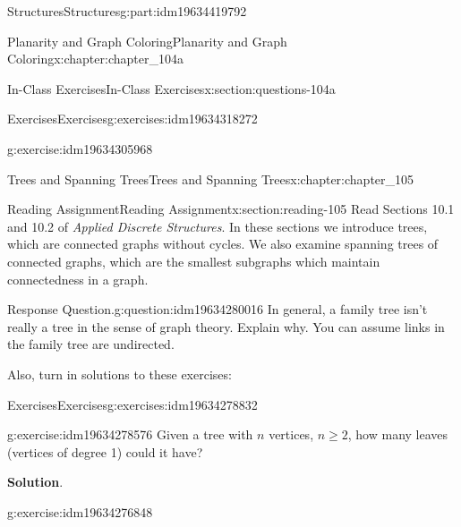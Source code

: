 \documentclass[oneside,10pt,]{book}
\newcommand{\blocktitlefont}{\relax}
\numberwithin{equation}{section}
\begin{document}
\begin{partptx}{Structures}{}{Structures}{}{}{g:part:idm19634419792}
\begin{chapterptx}{Planarity and Graph Coloring}{}{Planarity and Graph Coloring}{}{}{x:chapter:chapter_104a}
\begin{sectionptx}{In-Class Exercises}{}{In-Class Exercises}{}{}{x:section:questions-104a}
\begin{exercises-subsection-numberless}{Exercises}{}{Exercises}{}{}{g:exercises:idm19634318272}
\begin{exercisegroup}
\begin{divisionexerciseeg}{5}{}{}{g:exercise:idm19634305968}
\begin{enumerate}[label=(\alph*)]
\end{enumerate}
%
\end{divisionexerciseeg}%
\end{exercisegroup}
\par\medskip\noindent
\end{exercises-subsection-numberless}
\end{sectionptx}
\end{chapterptx}
%
\typeout{************************************************}
\typeout{************************************************}
%
\begin{chapterptx}{Trees and Spanning Trees}{}{Trees and Spanning Trees}{}{}{x:chapter:chapter_105}
\index{}%
%
%
\typeout{************************************************}
\typeout{************************************************}
%
\begin{sectionptx}{Reading Assignment}{}{Reading Assignment}{}{}{x:section:reading-105}
Read Sections 10.1 and 10.2 of \emph{Applied Discrete Structures}. In these sections we introduce trees, which are connected graphs without cycles.  We also examine spanning trees of connected graphs, which are the smallest subgraphs which maintain connectedness in a graph.%
\begin{question}{Response Question.}{g:question:idm19634280016}%
In general, a family tree isn't really a tree in the sense of graph theory. Explain why.  You can assume links in the family tree are undirected.%
\end{question}
Also, turn in solutions to these exercises:%
%
%
\typeout{************************************************}
\typeout{************************************************}
%
\begin{exercises-subsection-numberless}{Exercises}{}{Exercises}{}{}{g:exercises:idm19634278832}
\par\medskip\noindent%
%
\begin{exercisegroup}
\begin{divisionexerciseeg}{1}{}{}{g:exercise:idm19634278576}%
Given a tree with \(n\) vertices, \(n \geq 2\), how many leaves (vertices of degree 1) could it have?%
\par\smallskip%
\noindent\textbf{\blocktitlefont Solution}.\hypertarget{g:solution:idm19634277104}{}\quad{}%
\end{divisionexerciseeg}%
\begin{divisionexerciseeg}{2}{}{}{g:exercise:idm19634276848}%

\end{divisionexerciseeg}
\end{exercisegroup}
\end{exercises-subsection-numberless}
\end{sectionptx}
\end{chapterptx}
\end{partptx}
\end{document}
